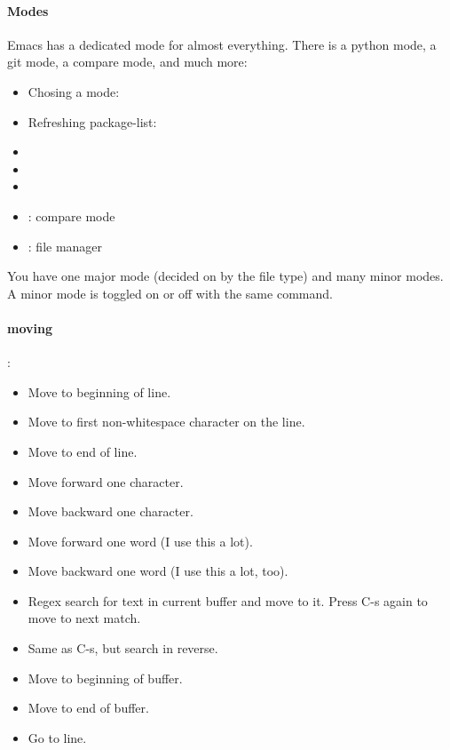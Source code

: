 \paragraph{Modes} Emacs has a dedicated mode for almost everything. There is a python mode, a git mode, a compare mode, and much more:
\begin{itemize}
    \item Chosing a mode: 
    \item Refreshing package-list: 
    \item {}
    \item {}
    \item {}
    \item {}: compare mode
    \item {}: file manager
\end{itemize}
You have one major mode (decided on by the file type) and many minor modes. A minor mode is toggled on or off with the same command. 


\paragraph{moving}:
\begin{itemize}
    \item {} 	Move to beginning of line.
    \item {} 	Move to first non-whitespace character on the line.
    \item {} 	Move to end of line.
    \item {} 	Move forward one character.
    \item {} 	Move backward one character.
    \item {} 	Move forward one word (I use this a lot).
    \item {} 	Move backward one word (I use this a lot, too).
    \item {} 	Regex search for text in current buffer and move to it. Press C-s again to move to next match.
    \item {} 	Same as C-s, but search in reverse.
    \item {} 	Move to beginning of buffer.
    \item {} 	Move to end of buffer.
    \item {} Go to line. 
\end{itemize}

